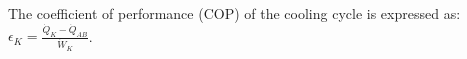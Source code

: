The coefficient of performance (COP) of the cooling cycle is expressed as:  
\( \epsilon_K = \frac{\dot{Q}_K - \dot{Q}_{AB}}{\dot{W}_K} \).